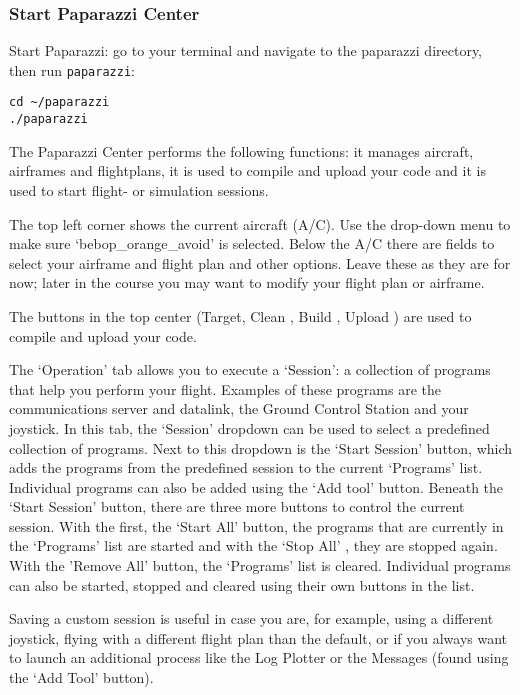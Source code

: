 \subsubsection*{Start Paparazzi Center}
Start Paparazzi: go to your terminal and navigate to the paparazzi directory, then run \texttt{paparazzi}:

\begin{lstlisting}[style=Bash]
cd ~/paparazzi
./paparazzi
\end{lstlisting}

The Paparazzi Center performs the following functions: it manages aircraft, airframes and flightplans, it is used to compile and upload your code and it is used to start flight- or simulation sessions.

The top left corner shows the current aircraft (A/C). Use the drop-down menu to make sure `bebop\_orange\_avoid' is selected. Below the A/C there are fields to select your airframe and flight plan and other options. Leave these as they are for now; later in the course you may want to modify your flight plan or airframe.

The buttons in the top center (Target, Clean , Build , Upload ) are used to compile and upload your code.

The `Operation' tab allows you to execute a `Session': a collection of programs that help you perform your flight. Examples of these programs are the communications server and datalink, the Ground Control Station and your joystick. In this tab, the `Session' dropdown can be used to select a predefined collection of programs. Next to this dropdown is the `Start Session'  button, which adds the programs from the predefined session to the current `Programs' list. Individual programs can also be added using the `Add tool' button. Beneath the `Start Session'  button, there are three more buttons to control the current session. With the first, the `Start All'  button, the programs that are currently in the `Programs' list are started and with the `Stop All' , they are stopped again. With the 'Remove All'  button, the `Programs' list is cleared. Individual programs can also be started, stopped and cleared using their own buttons in the list.

Saving a custom session is useful in case you are, for example, using a different joystick, flying with a different flight plan than the default, or if you always want to launch an additional process like the Log Plotter or the Messages (found using the `Add Tool' button).

